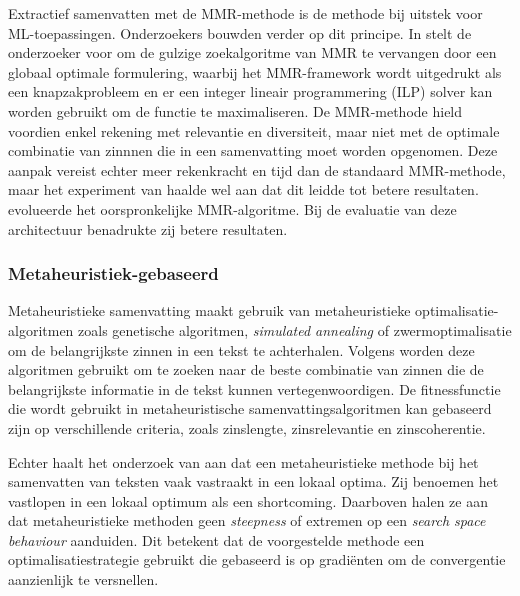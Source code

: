 Extractief samenvatten met de MMR-methode is de methode bij uitstek voor ML-toepassingen. Onderzoekers bouwden verder op dit principe. In \textcite{McDonald2007} stelt de onderzoeker voor om de gulzige zoekalgoritme van MMR te vervangen door een globaal optimale formulering, waarbij het MMR-framework wordt uitgedrukt als een knapzakprobleem en er een integer lineair programmering (ILP) solver kan worden gebruikt om de functie te maximaliseren. De MMR-methode hield voordien enkel rekening met relevantie en diversiteit, maar niet met de optimale combinatie van zinnnen die in een samenvatting moet worden opgenomen. Deze aanpak vereist echter meer rekenkracht en tijd dan de standaard MMR-methode, maar het experiment van \textcite{McDonald2007} haalde wel aan dat dit leidde tot betere resultaten. \textcite{Lin2010} evolueerde het oorspronkelijke MMR-algoritme. Bij de evaluatie van deze architectuur benadrukte zij betere resultaten. 

\subsubsection{Metaheuristiek-gebaseerd}

Metaheuristieke samenvatting maakt gebruik van metaheuristieke optimalisatie-algoritmen zoals genetische algoritmen, \textit{simulated annealing} of zwermoptimalisatie om de belangrijkste zinnen in een tekst te achterhalen. Volgens \textcite{Verma2020} \textcite{Premjith2015} worden deze algoritmen gebruikt om te zoeken naar de beste combinatie van zinnen die de belangrijkste informatie in de tekst kunnen vertegenwoordigen. De fitnessfunctie die wordt gebruikt in metaheuristische samenvattingsalgoritmen kan gebaseerd zijn op verschillende criteria, zoals zinslengte, zinsrelevantie en zinscoherentie.

Echter haalt het onderzoek van \textcite{Rani2021} aan dat een metaheuristieke methode bij het samenvatten van teksten vaak vastraakt in een lokaal optima. Zij benoemen het vastlopen in een lokaal optimum als een shortcoming. Daarboven halen ze aan dat metaheuristieke methoden geen \textit{steepness} of extremen op een \textit{search space behaviour} aanduiden. Dit betekent dat de voorgestelde methode een optimalisatiestrategie gebruikt die gebaseerd is op gradiënten om de convergentie aanzienlijk te versnellen. 



